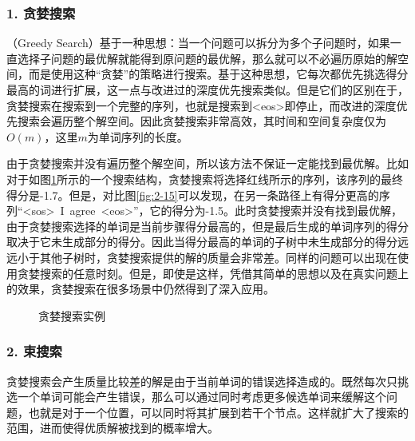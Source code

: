 
\subsubsection{1. 贪婪搜索}

（Greedy Search）基于一种思想：当一个问题可以拆分为多个子问题时，如果一直选择子问题的最优解就能得到原问题的最优解，那么就可以不必遍历原始的解空间，而是使用这种“贪婪”的策略进行搜索。基于这种思想，它每次都优先挑选得分最高的词进行扩展，这一点与改进过的深度优先搜索类似。但是它们的区别在于，贪婪搜索在搜索到一个完整的序列，也就是搜索到<eos>即停止，而改进的深度优先搜索会遍历整个解空间。因此贪婪搜索非常高效，其时间和空间复杂度仅为$O(m)$，这里$m$为单词序列的长度。

\parinterval 由于贪婪搜索并没有遍历整个解空间，所以该方法不保证一定能找到最优解。比如对于如图\ref{fig:2-17}所示的一个搜索结构，贪婪搜索将选择红线所示的序列，该序列的最终得分是-1.7。但是，对比图\ref{fig:2-15}可以发现，在另一条路径上有得分更高的序列“<sos>\ I\ agree\ <eos>”，它的得分为-1.5。此时贪婪搜索并没有找到最优解，由于贪婪搜索选择的单词是当前步骤得分最高的，但是最后生成的单词序列的得分取决于它未生成部分的得分。因此当得分最高的单词的子树中未生成部分的得分远远小于其他子树时，贪婪搜索提供的解的质量会非常差。同样的问题可以出现在使用贪婪搜索的任意时刻。但是，即使是这样，凭借其简单的思想以及在真实问题上的效果，贪婪搜索在很多场景中仍然得到了深入应用。

\begin{figure}[htp]
    \centering
 	
	\caption{贪婪搜索实例}
    \label{fig:2-17}
\end{figure}


\subsubsection{2. 束搜索}

\parinterval 贪婪搜索会产生质量比较差的解是由于当前单词的错误选择造成的。既然每次只挑选一个单词可能会产生错误，那么可以通过同时考虑更多候选单词来缓解这个问题，也就是对于一个位置，可以同时将其扩展到若干个节点。这样就扩大了搜索的范围，进而使得优质解被找到的概率增大。

